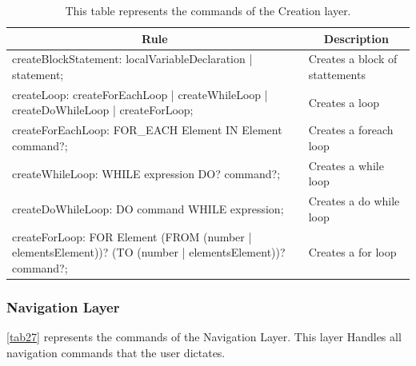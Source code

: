 \begin{table}[H]
	\centering
	\begin{tabular}{|p{8cm}|p{7cm}|}
		\hline
		\multicolumn{1}{|c|}{{\bf Rule}} & \multicolumn{1}{c|}{{\bf Description}} \\ \hline
		createBlockStatement: localVariableDeclaration | statement;                                                                                             & Creates a block of stattements         \\ \hline
		createLoop: createForEachLoop | createWhileLoop | createDoWhileLoop | createForLoop;                                                                    & Creates a loop                         \\ \hline
		createForEachLoop: FOR\_EACH Element IN Element command?;                                                                                               & Creates a foreach loop                 \\ \hline
		createWhileLoop: WHILE expression DO? command?;                                                                                                         & Creates a while loop                   \\ \hline
		createDoWhileLoop: DO command WHILE expression;                                                                                                         & Creates a do while loop                \\ \hline
		createForLoop: FOR Element (FROM (number | elementsElement))? (TO (number | elementsElement))? command?;                                                & Creates a for loop                     \\ \hline
	\end{tabular}
	\caption{This table represents the commands of the Creation layer.}
	\label{tab26}
\end{table}

\subsubsection{Navigation Layer}
\autoref{tab27} represents the commands of the Navigation Layer.  This layer Handles all navigation commands that the user dictates.

